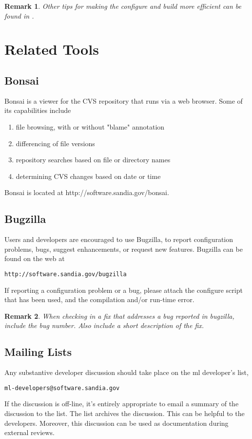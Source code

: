 \documentclass[10pt,letter,relax]{SANDreport}
\newtheorem{remark}{Remark}
\newcommand{\ML}     {{\sc ml }}
\begin{document}
\begin{remark}
  Other tips for making the configure and build more efficient can
  be found in \cite[Section 2.6]{Trilinos-Dev-Guide}.
\end{remark}


\section{Related Tools}
\label{sec:tools}
%
\subsection{Bonsai}
\label{bonsai}
Bonsai is a viewer for the CVS repository that runs via a web browser.
Some of its capabilities include
        \begin{enumerate}
	\item file browsing, with or without "blame" annotation
	\item differencing of file versions
	\item repository searches based on file or directory names
	\item determining CVS changes based on date or time
        \end{enumerate}
Bonsai is located at http://software.sandia.gov/bonsai.
%
\subsection{Bugzilla}
%
Users and developers are encouraged to use Bugzilla, to
report configuration problems, bugs, suggest enhancements, or request
new features. Bugzilla can be found on the web at 
\begin{verbatim}
http://software.sandia.gov/bugzilla
\end{verbatim}
If reporting a configuration problem or a bug, please attach the
configure script that has been used, and the compilation and/or run-time
error.

\begin{remark}
  When checking in a fix that addresses a bug reported in bugzilla,
  include the bug number.  Also include a short description of the fix.
\end{remark}

\subsection{Mailing Lists}

Any substantive developer discussion should take place on the \ML
developer's list, 
\begin{verbatim}
ml-developers@software.sandia.gov
\end{verbatim}
If the discussion is off-line, it's entirely appropriate to email a
summary of the discussion to the list.
The list archives the discussion.  This can be helpful to the
developers.  Moreover, this discussion can be used as documentation during
external reviews.
\end{document}
